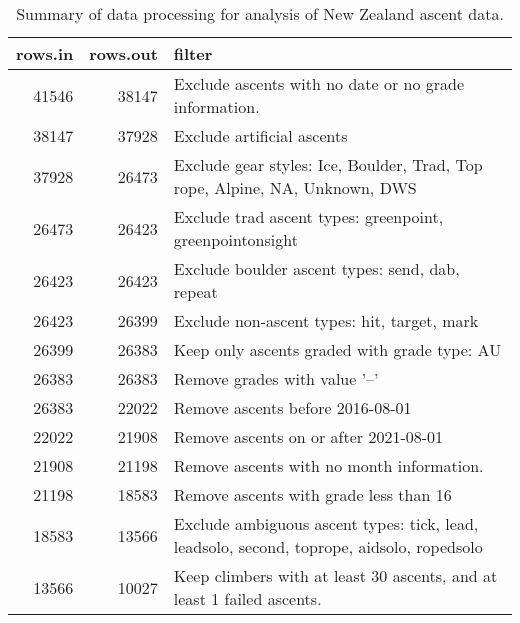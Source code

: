 \begin{table}[ht]
\centering
\begingroup\fontsize{9pt}{10pt}\selectfont
\begin{tabular}{rrl}
  \hline
{\bf rows.in} & {\bf rows.out} & {\bf filter} \\ 
  \hline
41546 & 38147 & Exclude ascents with no date or no grade information. \\ 
  38147 & 37928 & Exclude artificial ascents \\ 
  37928 & 26473 & Exclude gear styles: Ice, Boulder, Trad, Top rope, Alpine, NA, Unknown, DWS \\ 
  26473 & 26423 & Exclude trad ascent types: greenpoint, greenpointonsight \\ 
  26423 & 26423 & Exclude boulder ascent types: send, dab, repeat \\ 
  26423 & 26399 & Exclude non-ascent types: hit, target, mark \\ 
  26399 & 26383 & Keep only ascents graded with grade type: AU \\ 
  26383 & 26383 & Remove grades with value '--' \\ 
  26383 & 22022 & Remove ascents before 2016-08-01 \\ 
  22022 & 21908 & Remove ascents on or after 2021-08-01 \\ 
  21908 & 21198 & Remove ascents with no month information. \\ 
  21198 & 18583 & Remove ascents with grade less than 16 \\ 
  18583 & 13566 & Exclude ambiguous ascent types: tick, lead, leadsolo, second, toprope, aidsolo, ropedsolo \\ 
  13566 & 10027 & Keep climbers with at least 30 ascents, and at least 1 failed ascents. \\ 
   \hline
\end{tabular}
\endgroup
\caption{Summary of data processing for analysis of New Zealand ascent data.} 
\label{table-data-processing-nz}
\end{table}
